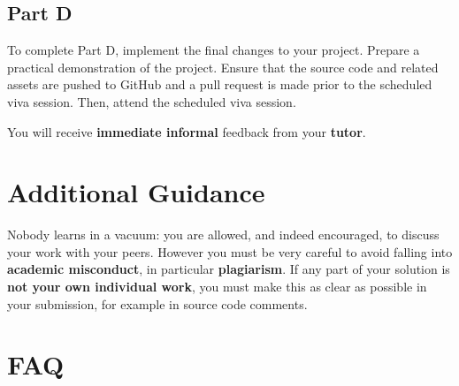 \documentclass{../../fal_assignment}
\begin{document}
	
	\subsection*{Part D}
	To complete Part D, implement the final changes to your project. Prepare a practical demonstration of the project. Ensure that the source code and related assets are pushed to GitHub and a pull request is made prior to the scheduled viva session. Then, attend the scheduled viva session. 
	
	You will receive \textbf{immediate informal} feedback from your \textbf{tutor}.
	
	\section*{Additional Guidance}

	Nobody learns in a vacuum: you are allowed, and indeed encouraged, to discuss your work with your peers. 
	However you must be very careful to avoid falling into \textbf{academic misconduct}, 
	in particular \textbf{plagiarism}. If any part of your solution is \textbf{not your own individual work}, you must make this as clear as possible in your submission, for example in source code comments.
	
	\section*{FAQ}
	
\end{document}
